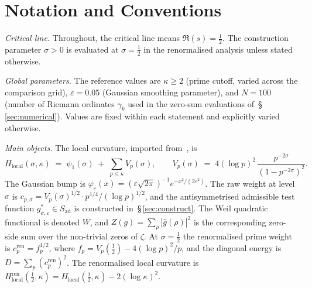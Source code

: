\documentclass[11pt]{article}
\newcommand{\Hlocal}{H_{\mathrm{local}}}
\newcommand{\Hren}{H_{\mathrm{local}}^{\mathrm{ren}}}
\newcommand{\Sad}{S_{\mathrm{ad}}}
\newcommand{\cren}{c_p^{\mathrm{ren}}}
\begin{document}
\begin{abstract}
\textbf{What remains open.}
Two questions separate the present construction from a full
prime-side derivation of Weil positivity for this family
(\S\,\ref{sec:open}).
Problem~\ref{op:spectral-ineq} (\emph{Spectral inequality})
asks whether $Z(g^*_{1/2,\varepsilon})\ge\Hlocal(\tfrac12,\kappa)$
holds unconditionally; an unconditional proof for this family
alone is necessary, but not sufficient, for the Riemann
Hypothesis in the absence of a density argument
in~$\Sad$.
Problem~\ref{op:offdiag} (\emph{Off-diagonal control}) asks for
an unconditional bound on the cross-terms
$\sum_\gamma\cos(\gamma\log(p/q))$ for $p\ne q$, which would
upgrade the formal asymptotic
$Z(g^*)\sim D\log\kappa\log\log\kappa$ to a proved statement.

\textbf{Structure.}
The formal core in \S\S\,\ref{sec:construct}--\ref{sec:scale} is
non-circular, with proved and conditional components explicitly
separated.
No use of the Riemann Hypothesis, the GUE conjecture, or the
Hilbert--P\'olya postulate is made anywhere in
\S\S\,\ref{sec:construct}--\ref{sec:scale}.
\end{abstract}

\vspace{2em}

\section*{Notation and Conventions}
\label{sec:notation}

\emph{Critical line.}
Throughout, the critical line means $\Re(s)=\tfrac12$.
The construction parameter $\sigma>0$ is evaluated at
$\sigma=\tfrac12$ in the renormalised analysis unless stated
otherwise.

\medskip
\emph{Global parameters.}
The reference values are $\kappa\ge 2$ (prime cutoff,
varied across the comparison grid),
$\varepsilon=0.05$ (Gaussian smoothing parameter), and
$N=100$ (number of Riemann ordinates $\gamma_k$ used in the
zero-sum evaluations of~\S\,\ref{sec:numerical}).
Values are fixed within each statement and explicitly varied
otherwise.

\medskip
\emph{Main objects.}
The local curvature, imported from~\cite{Paper1}, is
\[
\Hlocal(\sigma,\kappa) \;=\; \psi_1(\sigma)
\;+\; \sum_{p\le\kappa} V_p(\sigma),
\qquad
V_p(\sigma) \;=\; 4(\log p)^2\,
\frac{p^{-2\sigma}}{(1-p^{-2\sigma})^2}.
\]
The Gaussian bump is $\varphi_\varepsilon(x)=
(\varepsilon\sqrt{2\pi})^{-1} e^{-x^2/(2\varepsilon^2)}$.
The raw weight at level $\sigma$ is
$c_{p,\sigma} = V_p(\sigma)^{1/2}\cdot p^{1/4}/(\log p)^{1/2}$,
and the antisymmetrised admissible test function
$g^*_{\sigma,\varepsilon}\in\Sad$ is constructed
in~\S\,\ref{sec:construct}.
The Weil quadratic functional is denoted $W$, and
$Z(g)=\sum_\rho |\widehat g(\rho)|^2$ is the corresponding
zero-side sum over the non-trivial zeros of $\zeta$.
At $\sigma=\tfrac12$ the renormalised prime weight is
$\cren = f_p^{1/2}$, where
$f_p = V_p(\tfrac12)-4(\log p)^2/p$, and the diagonal
energy is $D=\sum_p (\cren)^2$.
The renormalised local curvature is
$\Hren(\tfrac12,\kappa)=\Hlocal(\tfrac12,\kappa)-2(\log\kappa)^2$.
\end{document}
